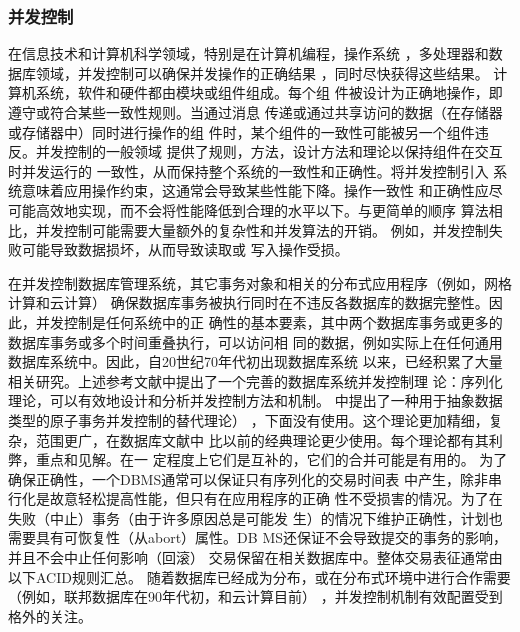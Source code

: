 \subsubsection{并发控制}
在信息技术和计算机科学领域，特别是在计算机编程，操作系统
，多处理器和数据库领域，并发控制可以确保并发操作的正确结果
，同时尽快获得这些结果。
计算机系统，软件和硬件都由模块或组件组成。每个组
件被设计为正确地操作，即遵守或符合某些一致性规则。当通过消息
传递或通过共享访问的数据（在存储器或存储器中）同时进行操作的组
件时，某个组件的一致性可能被另一个组件违反。并发控制的一般领域
提供了规则，方法，设计方法和理论以保持组件在交互时并发运行的
一致性，从而保持整个系统的一致性和正确性。将并发控制引入
系统意味着应用操作约束，这通常会导致某些性能下降。操作一致性
和正确性应尽可能高效地实现，而不会将性能降低到合理的水平以下。与更简单的顺序
算法相比，并发控制可能需要大量额外的复杂性和并发算法的开销。
例如，并发控制失败可能导致数据损坏，从而导致读取或
写入操作受损。

在并发控制数据库管理系统，其它事务对象和相关的分布式应用程序（例如，网格计算和云计算）
确保数据库事务被执行同时在不违反各数据库的数据完整性。因此，并发控制是任何系统中的正
确性的基本要素，其中两个数据库事务或更多的数据库事务或多个时间重叠执行，可以访问相
同的数据，例如实际上在任何通用数据库系统中。因此，自20世纪70年代初出现数据库系统
以来，已经积累了大量相关研究。上述参考文献中提出了一个完善的数据库系统并发控制理
论：序列化理论，可以有效地设计和分析并发控制方法和机制。
中提出了一种用于抽象数据类型的原子事务并发控制的替代理论）
，下面没有使用。这个理论更加精细，复杂，范围更广，在数据库文献中
比以前的经典理论更少使用。每个理论都有其利弊，重点和见解。在一
定程度上它们是互补的，它们的合并可能是有用的。
为了确保正确性，一个DBMS通常可以保证只有序列化的交易时间表
中产生，除非串行化是故意轻松提高性能，但只有在应用程序的正确
性不受损害的情况。为了在失败（中止）事务（由于许多原因总是可能发
生）的情况下维护正确性，计划也需要具有可恢复性（从abort）属性。DB
MS还保证不会导致提交的事务的影响，并且不会中止任何影响（回滚）
交易保留在相关数据库中。整体交易表征通常由以下ACID规则汇总。
随着数据库已经成为分布，或在分布式环境中进行合作需要（例如，联邦数据库在90年代初，和云计算目前）
，并发控制机制有效配置受到格外的关注。

